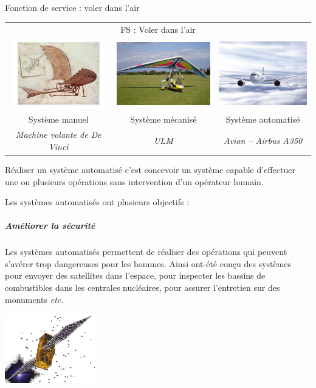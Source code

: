 \documentclass[11pt,oneside]{article}
\begin{document}
\begin{exemple}
  Fonction de service : voler dans l'air
\end{exemple}


\begin{center}
 \begin{tabular}{ccc}
  \multicolumn{3}{c}{FS : Voler dans l'air} \\
  \includegraphics[height=3cm]{png/machineLDV} &
  \includegraphics[height=3cm]{png/ulm} &
  \includegraphics[height=3cm]{png/a350} \\
  Système manuel & Système mécanisé & Système automatisé \\
  \textit{Machine volante de De Vinci} & \textit{ULM} & \textit{Avion -- Airbus
A350}
 \end{tabular}
\end{center}

Réaliser un système automatisé c'est concevoir un système capable d'effectuer une ou plusieurs opérations sans intervention d'un opérateur humain. 

Les systèmes automatisés ont plusieurs objectifs : 
\subparagraph*{Améliorer la sécurité}
\begin{minipage}[c]{0.7\textwidth}
 Les systèmes automatisés permettent de réaliser des opérations qui peuvent
s'avérer trop dangereuses pour les hommes. Ainsi ont-été conçu des systèmes
pour envoyer des satellites dans l'espace, pour inspecter les bassins de
combustibles dans les centrales nucléaires, pour assurer l'entretien sur des
monuments \textit{etc.}
\end{minipage}\hfill
\begin{minipage}[c]{0.2\textwidth}
 \begin{center}
 \includegraphics[height=3cm]{png/satellite}
 \end{center}
\end{minipage}
\end{document}

